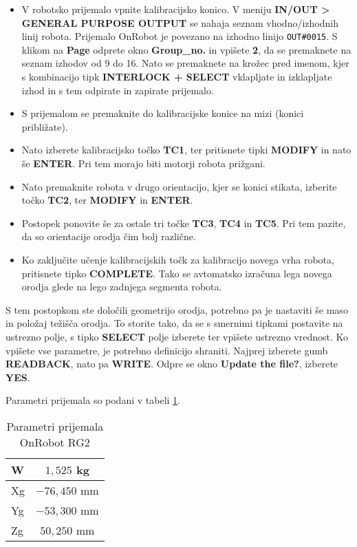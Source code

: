 \begin{itemize}
	\item V robotsko prijemalo vpnite kalibracijsko konico. V meniju \textbf{IN/OUT > GENERAL PURPOSE OUTPUT} se nahaja seznam vhodno/izhodnih linij robota. Prijemalo OnRobot je povezano na izhodno linijo \verb"OUT#0015". S klikom na \textbf{Page} odprete okno \textbf{Group\_no.} in vpišete \textbf{2}, da se premaknete na seznam izhodov od 9 do 16. Nato se premaknete na krožec pred imenom, kjer s kombinacijo tipk \textbf{INTERLOCK + SELECT} vklapljate in izklapljate izhod in s tem odpirate in zapirate prijemalo.
	\item S prijemalom se premaknite do kalibracijske konice na mizi (konici približate).
	\item Nato izberete kalibracijsko točko \textbf{TC1}, ter pritisnete tipki \textbf{MODIFY} in nato še \textbf{ENTER}. Pri tem morajo biti motorji robota prižgani.
	\item Nato premaknite robota v drugo orientacijo, kjer se konici stikata, izberite točko \textbf{TC2}, ter \textbf{MODIFY} in \textbf{ENTER}.
	\item Postopek ponovite še za ostale tri točke \textbf{TC3}, \textbf{TC4} in \textbf{TC5}. Pri tem pazite, da so orientacije orodja čim bolj različne.
	\item Ko zaključite učenje kalibracijskih točk za kalibracijo novega vrha robota, pritisnete tipko \textbf{COMPLETE}. Tako se avtomatsko izračuna lega novega orodja glede na lego zadnjega segmenta robota.
\end{itemize}

S tem postopkom ste določili geometrijo orodja, potrebno pa je nastaviti še maso in položaj težišča orodja. To storite tako, da se s smernimi tipkami postavite na ustrezno polje, s tipko \textbf{SELECT} polje izberete ter vpišete ustrezno vrednost. Ko vpišete vse parametre, je potrebno definicijo shraniti. Najprej izberete gumb \textbf{READBACK}, nato pa \textbf{WRITE}. Odpre se okno \textbf{Update the file?}, izberete \textbf{YES}.

Parametri prijemala so podani v tabeli  \ref{tab:rg3}.
\begin{table}
	\centering
	\caption{Parametri prijemala OnRobot RG2} \label{tab:rg3}
	\begin{tabular}{|l|c|}
		\hline W    & $1,525$ kg \\
		\hline Xg   & $-76,450$ mm \\
		\hline Yg   & $-53,300$ mm \\
		\hline Zg   & $50,250$ mm \\
		\hline
	\end{tabular}
\end{table}

